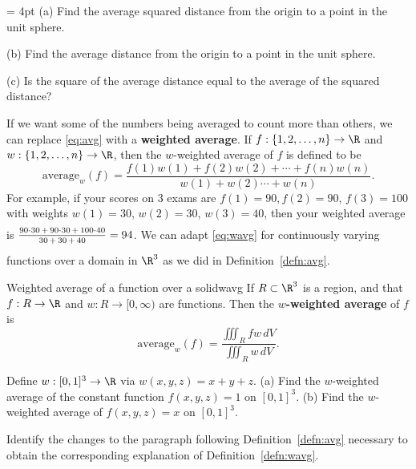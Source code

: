\documentclass{watsonbook}
\begin{document}
\begin{exercise}{}{} \parskip = 4pt
  (a) Find the average squared distance from the origin to a point in
  the unit sphere.

  (b) Find the average distance from the origin to a point in the unit
  sphere.

  (c) Is the square of the average distance equal to the average of
  the squared distance?
\end{exercise}

If we want some of the numbers being averaged to count more than
others, we can replace \eqref{eq:avg} with a \textbf{weighted
  average}. If $f:\{1,2,\ldots,n\} \rightarrow \R$ and
$w:\{1,2,\ldots,n\} \rightarrow \R$, then the $w$-weighted average of
$f$ is defined to be
\begin{equation} \label{eq:wavg} \mathrm{average}_w(f) =
  \frac{f(1)w(1) + f(2)w(2) + \cdots + f(n)w(n)}{w(1)+w(2) \cdots +
    w(n)}.
\end{equation}
For example, if your scores on 3 exams are $f(1)=90, f(2)=90$,
$f(3)=100$ with weights $w(1)=30$, $w(2)=30$, $w(3)=40$, then your
weighted average is
$\rule[-12pt]{0pt}{24pt}\tfrac{\rule[-2pt]{0pt}{12pt} 90\cdot 30 \,+\,
  90\cdot 30 \,+\, 100 \cdot 40}{\rule{0pt}{6pt} 30\,+\,30\,+\,40} = 94$. We
can adapt \eqref{eq:wavg} for continuously varying functions over a
domain in $\R^3$ as we did in Definition~\ref{defn:avg}. 

\begin{defn}{Weighted average of a function over a solid}{wavg}
  If $R\subset \R^3$ is a region, and that $f : R \to \R$ and
  $w : R \to [0,\infty)$ are functions. Then the \textbf{$w$-weighted
    average} of $f$ is
  \[
    \mathrm{average}_w(f) = \frac{\displaystyle{\iiint_R f w\,
        dV}}{\displaystyle{\iiint_R w \, dV}}.
  \]
\end{defn}

\begin{exercise}{}{}
  Define $w : [0,1]^3 \to \R$ via $w(x,y,z) = x+y+z$. (a) Find the
  $w$-weighted average of the constant function $f(x,y,z) = 1$ on
  $[0,1]^3$. (b) Find the $w$-weighted average of $f(x,y,z) = x$ on
  $[0,1]^3$.
\end{exercise}

\begin{exercise}{}{}
  Identify the changes to the paragraph following
  Definition~\ref{defn:avg} necessary to obtain the corresponding
  explanation of Definition~\ref{defn:wavg}.
\end{exercise}
\end{document}
